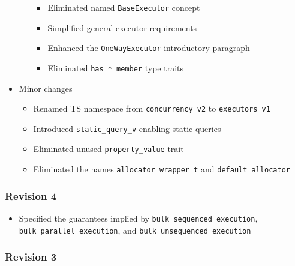 \documentclass[a4paper,12pt,notitlepage,twoside,openright]{article}
\begin{document}
\begin{itemize}
\begin{itemize}
    \begin{itemize}

    \item
      Eliminated named \texttt{BaseExecutor} concept
    \item
      Simplified general executor requirements
    \item
      Enhanced the \texttt{OneWayExecutor} introductory
      paragraph
    \item
      Eliminated \texttt{has_*_member} type traits
    \end{itemize}
  \end{itemize}
\item
  Minor changes

  \begin{itemize}

  \item
    Renamed TS namespace from \texttt{concurrency_v2} to
    \texttt{executors_v1}
  \item
    Introduced \texttt{static_query_v} enabling static
    queries
  \item
    Eliminated unused \texttt{property_value} trait
  \item
    Eliminated the names \texttt{allocator_wrapper_t} and
    \texttt{default_allocator}
  \end{itemize}
\end{itemize}

\hypertarget{revision-4}{%
\subsubsection{Revision 4}\label{revision-4}}

\begin{itemize}

\item
  Specified the guarantees implied by
  \texttt{bulk_sequenced_execution},
  \texttt{bulk_parallel_execution}, and
  \texttt{bulk_unsequenced_execution}
\end{itemize}

\hypertarget{revision-3}{%
\subsubsection{Revision 3}\label{revision-3}}
\end{document}
